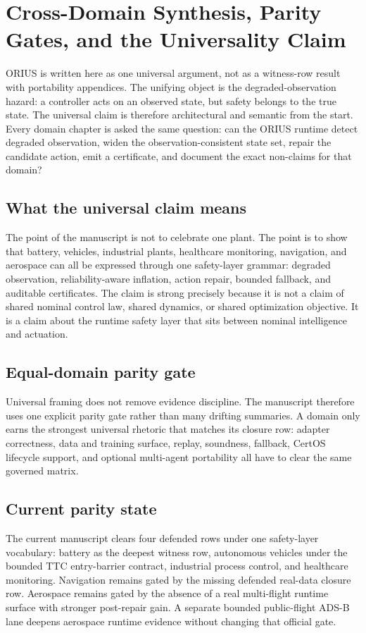 \chapter{Cross-Domain Synthesis, Parity Gates, and the Universality Claim}
\label{ch:cross-domain-synthesis}

ORIUS is written here as one universal argument, not as a witness-row result with
portability appendices.  The unifying object is the degraded-observation hazard: a
controller acts on an observed state, but safety belongs to the true state.  The
universal claim is therefore architectural and semantic from the start.  Every domain
chapter is asked the same question: can the ORIUS runtime detect degraded observation,
widen the observation-consistent state set, repair the candidate action, emit a
certificate, and document the exact non-claims for that domain?

\section{What the universal claim means}
The point of the manuscript is not to celebrate one plant.  The point is to show that
battery, vehicles, industrial plants, healthcare monitoring, navigation, and
aerospace can all be expressed through one safety-layer grammar: degraded observation,
reliability-aware inflation, action repair, bounded fallback, and auditable
certificates.  The claim is strong precisely because it is not a claim of shared
nominal control law, shared dynamics, or shared optimization objective.  It is a claim
about the runtime safety layer that sits between nominal intelligence and actuation.

\section{Equal-domain parity gate}
Universal framing does not remove evidence discipline.  The manuscript therefore uses
one explicit parity gate rather than many drifting summaries.  A domain only earns the
strongest universal rhetoric that matches its closure row: adapter correctness, data
and training surface, replay, soundness, fallback, CertOS lifecycle support, and
optional multi-agent portability all have to clear the same governed matrix.



\section{Current parity state}
The current manuscript clears four defended rows under one safety-layer vocabulary: battery as the deepest witness row, autonomous vehicles under the bounded TTC entry-barrier contract, industrial process control, and healthcare monitoring. Navigation remains gated by the missing defended real-data closure row. Aerospace remains gated by the absence of a real multi-flight runtime surface with stronger post-repair gain. A separate bounded public-flight ADS-B lane deepens aerospace runtime evidence without changing that official gate.

